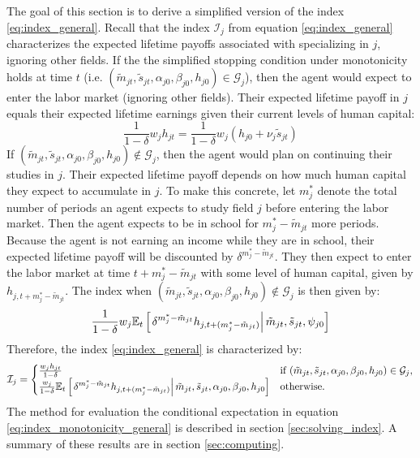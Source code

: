 \documentclass[11 pt]{article}
\newcommand{\pr}[1]{\left( #1 \right)}
\newcommand{\ce}[2]{\left[\left. #1 \right\vert #2 \right]}
\newcommand{\study}{m} %
\newcommand{\pass}{s}
\newcommand{\states}{\tilde{\study}_{jt}, \tilde{\pass}_{jt}, \alpha_{j0}, \beta_{j0}, h_{j0}}
\newcommand{\pstates}{\tilde{\study}_{jt}, \tilde{\pass}_{jt}, \psi_{j0}}
\begin{document}
The goal of this section is to derive a simplified version of the index \eqref{eq:index_general}.
Recall that the index $\mathcal{I}_j$ from equation \eqref{eq:index_general} characterizes the expected lifetime payoffs associated with specializing in $j$, ignoring other fields. 
If the the simplified stopping condition under monotonicity holds at time $t$ (i.e. $\pr{\states} \in \mathcal{G}_j$), then the agent would expect to enter the labor market (ignoring other fields).
Their expected lifetime payoff in $j$ equals their expected lifetime earnings given their current levels of human capital:
\begin{equation*}
    \frac{1}{1 - \delta} w_j h_{jt} 
    = 
    \frac{1}{1 - \delta} w_j 
    \pr{h_{j0} + \nu_j \tilde{\pass}_{jt}}
\end{equation*}
If $\pr{\states} \notin \mathcal{G}_j$, then the agent would plan on continuing their studies in $j$. 
Their expected lifetime payoff depends on how much human capital they expect to accumulate in $j$. 
To make this concrete, let $\study_{j}^*$ denote the total number of periods an agent expects to study field $j$ before entering the labor market.
Then the agent expects to be in school for $\study_j^* - \tilde{\study}_{jt}$ more periods.
Because the agent is not earning an income while they are in school, their expected lifetime payoff will be discounted by $\delta^{\study_j^* - \tilde{\study}_{jt}}$.
They then expect to enter the labor market at time $t + \study_j^* - \tilde{\study}_{jt}$ with some level of human capital, given by $h_{j,t + \study_j^* - \tilde{\study}_{jt}}$.
The index when $(\states) \notin \mathcal{G}_j$ is then given by:
\begin{equation*}
    \frac{1}{1 - \delta} w_j \EE_t \ce{
        \delta^{\study_j^* - \tilde{\study}_{jt}}
        h_{j,t + (\study_j^* - \tilde{\study}_{jt})}
    }{\pstates} 
\end{equation*}
Therefore, the index \eqref{eq:index_general} is characterized by:
\begin{multline}
    \label{eq:index_monotonicity_general}
    \mathcal{I}_j %
    = 
    \begin{cases}
    \frac{w_j h_{jt}}{1 - \delta}
    &\text{if } (\states) \in \mathcal{G}_j,
    \\
    \frac{w_j}{1 - \delta} \EE_t \ce{
        \delta^{\study_j^* - \tilde{\study}_{jt}}
        h_{j,t + (\study_j^* - \tilde{\study}_{jt})}
    }{\states}
    &\text{otherwise.}
    \end{cases} 
\end{multline}
The method for evaluation the conditional expectation in equation \eqref{eq:index_monotonicity_general} is described in section \ref{sec:solving_index}.
A summary of these results are in section \ref{sec:computing}.
\end{document}

